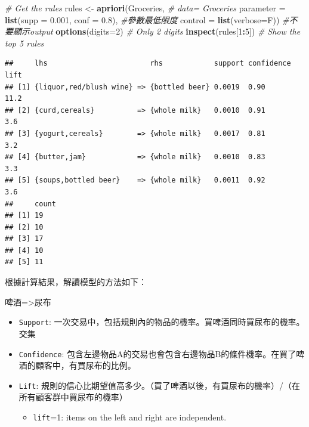 \documentclass[]{book}
\newenvironment{Shaded}{\begin{snugshade}}{\end{snugshade}}
\newcommand{\CommentTok}[1]{\textcolor[rgb]{0.56,0.35,0.01}{\textit{#1}}}
\newcommand{\DataTypeTok}[1]{\textcolor[rgb]{0.13,0.29,0.53}{#1}}
\newcommand{\DecValTok}[1]{\textcolor[rgb]{0.00,0.00,0.81}{#1}}
\newcommand{\FloatTok}[1]{\textcolor[rgb]{0.00,0.00,0.81}{#1}}
\newcommand{\KeywordTok}[1]{\textcolor[rgb]{0.13,0.29,0.53}{\textbf{#1}}}
\newcommand{\NormalTok}[1]{#1}
\newcommand{\OperatorTok}[1]{\textcolor[rgb]{0.81,0.36,0.00}{\textbf{#1}}}
\newcommand{\StringTok}[1]{\textcolor[rgb]{0.31,0.60,0.02}{#1}}
\providecommand{\tightlist}{%
  \setlength{\itemsep}{0pt}\setlength{\parskip}{0pt}}
\begin{document}
\begin{Shaded}
\begin{Highlighting}[]
\CommentTok{# Get the rules}
\NormalTok{rules <-}\StringTok{ }\KeywordTok{apriori}\NormalTok{(Groceries, }\CommentTok{# data= Groceries}
                 \DataTypeTok{parameter =} \KeywordTok{list}\NormalTok{(}\DataTypeTok{supp =} \FloatTok{0.001}\NormalTok{, }\DataTypeTok{conf =} \FloatTok{0.8}\NormalTok{), }\CommentTok{#參數最低限度}
                 \DataTypeTok{control =} \KeywordTok{list}\NormalTok{(}\DataTypeTok{verbose=}\NormalTok{F)) }\CommentTok{#不要顯示output}
\KeywordTok{options}\NormalTok{(}\DataTypeTok{digits=}\DecValTok{2}\NormalTok{) }\CommentTok{# Only 2 digits}
\KeywordTok{inspect}\NormalTok{(rules[}\DecValTok{1}\OperatorTok{:}\DecValTok{5}\NormalTok{]) }\CommentTok{# Show the top 5 rules}
\end{Highlighting}
\end{Shaded}

\begin{verbatim}
##     lhs                        rhs            support confidence lift
## [1] {liquor,red/blush wine} => {bottled beer} 0.0019  0.90       11.2
## [2] {curd,cereals}          => {whole milk}   0.0010  0.91        3.6
## [3] {yogurt,cereals}        => {whole milk}   0.0017  0.81        3.2
## [4] {butter,jam}            => {whole milk}   0.0010  0.83        3.3
## [5] {soups,bottled beer}    => {whole milk}   0.0011  0.92        3.6
##     count
## [1] 19   
## [2] 10   
## [3] 17   
## [4] 10   
## [5] 11
\end{verbatim}

根據計算結果，解讀模型的方法如下：

啤酒=\textgreater 尿布

\begin{itemize}
\tightlist
\item
  \texttt{Support}: 一次交易中，包括規則內的物品的機率。買啤酒同時買尿布的機率。交集
\item
  \texttt{Confidence}: 包含左邊物品A的交易也會包含右邊物品B的條件機率。在買了啤酒的顧客中，有買尿布的比例。
\item
  \texttt{Lift}: 規則的信心比期望值高多少。（買了啤酒以後，有買尿布的機率）/（在所有顧客群中買尿布的機率）

  \begin{itemize}
  \tightlist
  \item
    \texttt{lift}=1: items on the left and right are independent.
  \end{itemize}
\end{itemize}
\end{document}
